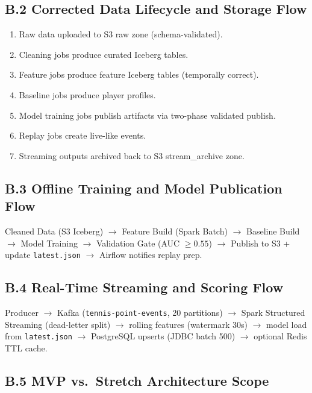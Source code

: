 \documentclass[11pt,a4paper]{article}
\begin{document}
\subsection*{B.2 Corrected Data Lifecycle and Storage Flow}

\begin{enumerate}[nosep]
  \item Raw data uploaded to S3 raw zone (schema-validated).
  \item Cleaning jobs produce curated Iceberg tables.
  \item Feature jobs produce feature Iceberg tables (temporally correct).
  \item Baseline jobs produce player profiles.
  \item Model training jobs publish artifacts via two-phase validated publish.
  \item Replay jobs create live-like events.
  \item Streaming outputs archived back to S3 stream\_archive zone.
\end{enumerate}

\subsection*{B.3 Offline Training and Model Publication Flow}

Cleaned Data (S3 Iceberg) $\to$ Feature Build (Spark Batch) $\to$ Baseline Build $\to$
Model Training $\to$ Validation Gate (AUC $\geq 0.55$) $\to$ Publish to S3 + update
\texttt{latest.json} $\to$ Airflow notifies replay prep.

\subsection*{B.4 Real-Time Streaming and Scoring Flow}

Producer $\to$ Kafka (\texttt{tennis-point-events}, 20 partitions) $\to$
Spark Structured Streaming (dead-letter split) $\to$ rolling features (watermark 30s) $\to$
model load from \texttt{latest.json} $\to$ PostgreSQL upserts (JDBC batch 500) $\to$
optional Redis TTL cache.

\subsection*{B.5 MVP vs.\ Stretch Architecture Scope}
\end{document}
